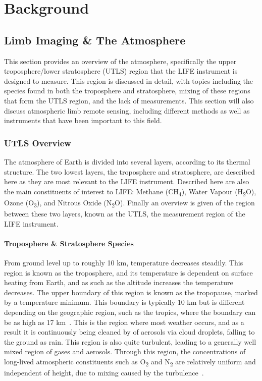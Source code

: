\chapter{Background} \label{bkgnd}

\section{Limb Imaging \& The Atmosphere}
This section provides an overview of the atmosphere, specifically the upper troposphere/lower stratosphere (UTLS) region that the LIFE instrument is designed to measure. This region is discussed in detail, with topics including the species found in both the troposphere and stratosphere, mixing of these regions that form the UTLS region, and the lack of measurements. This section will also discuss atmospheric limb remote sensing, including different methods as well as instruments that have been important to this field.

\subsection{UTLS Overview}
The atmosphere of Earth is divided into several layers, according to its thermal structure. The two lowest layers, the troposphere and stratosphere, are described here as they are most relevant to the LIFE instrument. Described here are also the main constituents of interest to LIFE: Methane (CH\textsubscript{4}), Water Vapour (H\textsubscript{2}O), Ozone (O\textsubscript{3}), and Nitrous Oxide (N\textsubscript{2}O). Finally an overview is given of the region between these two layers, known as the UTLS, the measurement region of the LIFE instrument.

\subsubsection{Troposphere \& Stratosphere Species}
From ground level up to roughly 10 km, temperature decreases steadily. This region is known as the troposphere, and its temperature is dependent on surface heating from Earth, and as such as the altitude increases the temperature decreases. The upper boundary of this region is known as the tropopause, marked by a temperature minimum. This boundary is typically 10 km but is different depending on the geographic region, such as the tropics, where the boundary can be as high as 17 km~\citep{ext_utls}. This is the region where most weather occurs, and as a result it is continuously being cleaned by of aerosols via cloud droplets, falling to the ground as rain. This region is also quite turbulent, leading to a generally well mixed region of gases and aerosols. Through this region, the concentrations of long-lived atmospheric constituents such as O\textsubscript{2} and N\textsubscript{2} are relatively uniform and independent of height, due to mixing caused by the turbulence~\citep{atmos_phys_and_climate}.

